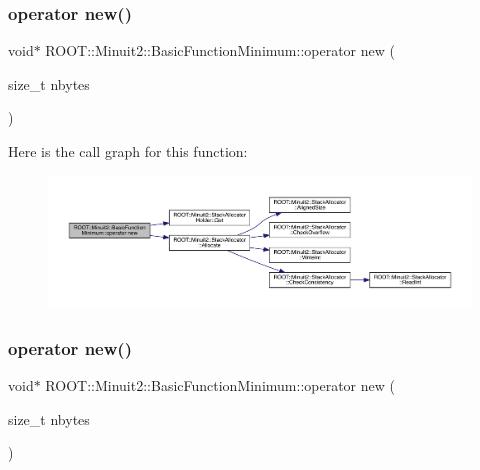 \subsubsection{\texorpdfstring{operator new()}{operator new()}\hspace{0.1cm}{\footnotesize\ttfamily [1/2]}}
{\footnotesize\ttfamily void$\ast$ R\+O\+O\+T\+::\+Minuit2\+::\+Basic\+Function\+Minimum\+::operator new (\begin{DoxyParamCaption}\item[{size\+\_\+t}]{nbytes }\end{DoxyParamCaption})\hspace{0.3cm}{\ttfamily [inline]}}

Here is the call graph for this function\+:
\nopagebreak
\begin{figure}[H]
\begin{center}
\leavevmode
\includegraphics[width=350pt]{de/d25/classROOT_1_1Minuit2_1_1BasicFunctionMinimum_a49a32bdb3ff21202fcfa9a9e42015b8f_cgraph}
\end{center}
\end{figure}
\mbox{\label{classROOT_1_1Minuit2_1_1BasicFunctionMinimum_a49a32bdb3ff21202fcfa9a9e42015b8f}} 
\subsubsection{\texorpdfstring{operator new()}{operator new()}\hspace{0.1cm}{\footnotesize\ttfamily [2/2]}}
{\footnotesize\ttfamily void$\ast$ R\+O\+O\+T\+::\+Minuit2\+::\+Basic\+Function\+Minimum\+::operator new (\begin{DoxyParamCaption}\item[{size\+\_\+t}]{nbytes }\end{DoxyParamCaption})\hspace{0.3cm}{\ttfamily [inline]}}

